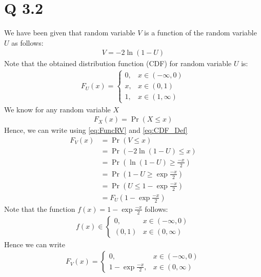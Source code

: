\documentclass[journal,12pt,twocolumn]{article}
\begin{document}
\section{Q 3.2}
We have been given that random variable $V$ is a function of the random variable $U$ as follows:
\begin{align}
    V = -2\ln{(1 - U)}
    \label{eq:FuncRV}
\end{align}
	Note that the obtained distribution function (CDF) for random variable $U$ is:
\begin{align}
    	F_U(x) =
	\begin{cases}
		0, & x \in (-\infty, 0) \\
		x, & x \in (0, 1) \\
		1, & x \in (1, \infty)
	\end{cases}
	\label{eq:CDF_U}
\end{align}
We know for any random variable $X$
\begin{align}
    F_X(x) = \Pr(X \leq x)
	    \label{eq:CDF_Def}
\end{align}
	Hence, we can write using \eqref{eq:FuncRV} and \eqref{eq:CDF_Def}
\begin{align}
	F_V(x) &= \Pr(V \leq x) \\
	&= \Pr(-2\ln{(1 - U)} \leq x)\\
	&= \Pr(\ln{(1 - U)} \geq \frac{-x}{2})\\
	&= \Pr(1 - U \geq \exp{\frac{-x}{2}})\\
	&= \Pr(U \leq 1 - \exp{\frac{-x}{2}})\\
	&= F_U(1 - \exp{\frac{-x}{2}})
	\label{eq: CDF_Rel}
\end{align}
Note that the function $f(x) = 1 - \exp{\frac{-x}{2}}$ follows:
\begin{align}
    f(x) \in
	\begin{cases}
	    {0}, & x \in (-\infty, 0) \\
	    (0, 1) & x \in (0, \infty)
	\end{cases}
\end{align}
Hence we can write
\begin{align}
	F_V(x) =
	\begin{cases}
	    0, & x \in (-\infty, 0) \\
	    1 - \exp{\frac{-x}{2}}, & x \in (0, \infty)
    	\end{cases}
\end{align}
\end{document}
